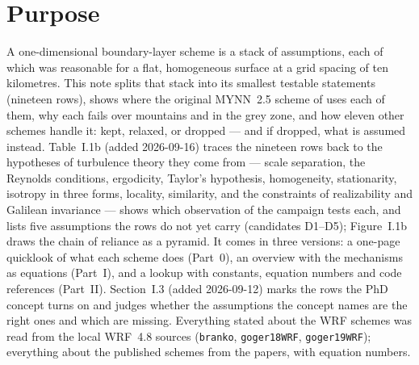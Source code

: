 \section*{Purpose}
A one-dimensional boundary-layer scheme is a stack of assumptions, each of which was
reasonable for a flat, homogeneous surface at a grid spacing of ten kilometres. This note
splits that stack into its smallest testable statements (nineteen rows), shows where the
original MYNN~2.5 scheme of \textcite{nakanishi2009} uses each of them, why each fails over
mountains and in the grey zone, and how eleven other schemes handle it: kept, relaxed, or
dropped --- and if dropped, what is assumed instead. Table~I.1b (added 2026-09-16) traces the nineteen rows back to the hypotheses of turbulence theory they come from --- scale separation, the Reynolds conditions, ergodicity, Taylor's hypothesis, homogeneity, stationarity, isotropy in three forms, locality, similarity, and the constraints of realizability and Galilean invariance --- shows which observation of the campaign tests each, and lists five assumptions the rows do not yet carry (candidates D1--D5); Figure~I.1b draws the chain of reliance as a pyramid. It comes in three versions: a one-page
quicklook of what each scheme does (Part~0), an overview with the mechanisms as equations
(Part~I), and a lookup with constants, equation numbers and code references (Part~II). Section~I.3 (added 2026-09-12) marks the rows the PhD concept turns on and judges whether the assumptions the concept names are the right ones and which are missing.
Everything stated about the WRF schemes was read from the local WRF~4.8 sources
(\texttt{branko}, \texttt{goger18WRF}, \texttt{goger19WRF}); everything about the published
schemes from the papers, with equation numbers.

